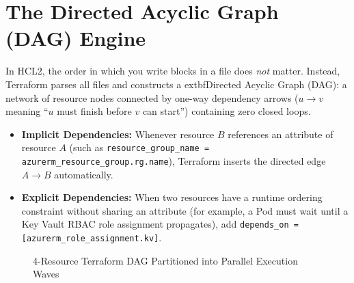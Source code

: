 \section{The Directed Acyclic Graph (DAG) Engine}
\label{sec:v3-ch04-dag}

In HCL2, the order in which you write blocks in a file does \emph{not} matter. Instead, Terraform parses all files and constructs a 	extbf{Directed Acyclic Graph (DAG)}: a network of resource nodes connected by one-way dependency arrows ($u \to v$ meaning ``$u$ must finish before $v$ can start'') containing zero closed loops.

\begin{itemize}[leftmargin=12pt]
  \item \textbf{Implicit Dependencies:} Whenever resource $B$ references an attribute of resource $A$ (such as \texttt{resource\_group\_name = azurerm\_resource\_group.rg.name}), Terraform inserts the directed edge $A \to B$ automatically.
  \item \textbf{Explicit Dependencies:} When two resources have a runtime ordering constraint without sharing an attribute (for example, a Pod must wait until a Key Vault RBAC role assignment propagates), add \texttt{depends\_on = [azurerm\_role\_assignment.kv]}.
\end{itemize}

\begin{figure}[htbp]
\centering
{}
\caption{4-Resource Terraform DAG Partitioned into Parallel Execution Waves}
\label{fig:v3-ch04-terraform-dag}
\end{figure}

